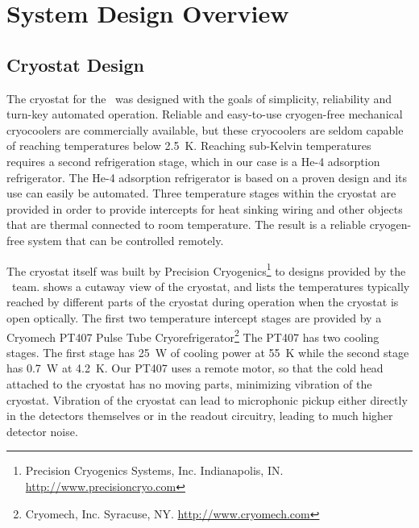 \chapter{System Design Overview}\label{c:sys-design}

\section{Cryostat Design}\label{s-cryo-design}

The cryostat for the \Imager\ was designed with the goals of simplicity, reliability and turn-key automated operation.
Reliable and easy-to-use cryogen-free mechanical cryocoolers are commercially available, but these cryocoolers are seldom capable of reaching temperatures below \SI{2.5}{\K}.
Reaching sub-Kelvin temperatures requires a second refrigeration stage, which in our case is a He-4 adsorption refrigerator.
The He-4 adsorption refrigerator is based on a proven design and its use can easily be automated.
Three temperature stages within the cryostat are provided in order to provide intercepts for heat sinking wiring and other objects that are thermal connected to room temperature. 
The result is a reliable cryogen-free system that can be controlled remotely.

The cryostat itself was built by Precision Cryogenics\footnote{Precision Cryogenics Systems, Inc. Indianapolis, IN. \url{http://www.precisioncryo.com}} to designs provided by the \Imager\ team.
 shows a cutaway view of the cryostat, and  lists the temperatures typically reached by different parts of the cryostat during operation when the cryostat is open optically.
The first two temperature intercept stages are provided by a Cryomech PT407 Pulse Tube Cryorefrigerator\footnote{Cryomech, Inc. Syracuse, NY. \url{http://www.cryomech.com}}
The PT407 has two cooling stages.
The first stage has \SI{25}{\W} of cooling power at \SI{55}{\K} while the second stage has \SI{0.7}{\W} at \SI{4.2}{\K}.
Our PT407 uses a remote motor, so that the cold head attached to the cryostat has no moving parts, minimizing vibration of the cryostat.
Vibration of the cryostat can lead to microphonic pickup either directly in the detectors themselves or in the readout circuitry, leading to much higher detector noise.

